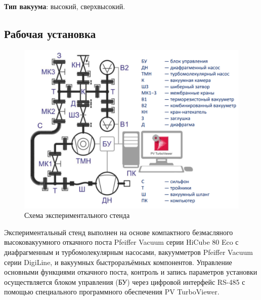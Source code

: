\documentclass[a4paper, 12pt]{article} %
\begin{document}
\textbf{Тип вакуума}: высокий, сверхвысокий.

\subsection{Рабочая установка}

\begin{figure}[h]
    \centering
    \includegraphics[width = 13 cm]{Схема}
    \caption{Схема экспериментального стенда}
    \label{fig:vac}
\end{figure}

Экспериментальный стенд выполнен на основе компактного безмасляного высоковакуумного откачного поста Pfeiffer Vacuum серии HiCube 80 Eco с диафрагменным и турбомолекулярным насосами, вакуумметров Pfeiffer Vacuum серии DigiLine, и вакуумных быстроразъёмных компонентов. Управление основными функциями откачного
поста, контроль и запись параметров установки осуществляется блоком управления (БУ) через цифровой интерфейс RS-485 с помощью специального программного обеспечения PV TurboViewer.
\end{document}
